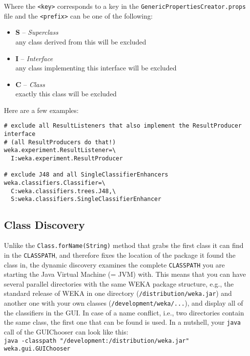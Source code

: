 \noindent Where the \verb=<key>= corresponds to a key in the
\verb=GenericPropertiesCreator.props= file and the \verb=<prefix>= can
be one of the following:

\begin{itemize}
\item \textbf{S} -- \textit{Superclass}\\
  any class derived from this will be excluded
\item \textbf{I} -- \textit{Interface}\\
  any class implementing this interface will be excluded
\item \textbf{C} -- \textit{Class}\\
  exactly this class will be excluded
\end{itemize}

\noindent Here are a few examples:

\begin{verbatim}
# exclude all ResultListeners that also implement the ResultProducer interface
# (all ResultProducers do that!)
weka.experiment.ResultListener=\
  I:weka.experiment.ResultProducer

# exclude J48 and all SingleClassifierEnhancers
weka.classifiers.Classifier=\
  C:weka.classifiers.trees.J48,\
  S:weka.classifiers.SingleClassifierEnhancer
\end{verbatim}

\newpage
\subsection{Class Discovery}
Unlike the \verb=Class.forName(String)= method that grabs the first class it
can find in the \verb=CLASSPATH=, and therefore fixes the location of the
package it found the class in, the dynamic discovery examines the
complete \verb=CLASSPATH= you are starting the Java Virtual Machine (= JVM)
with. This means that you can have several parallel directories with
the same WEKA package structure, e.g., the standard release of WEKA in
one directory (\verb=/distribution/weka.jar=) and another one with your own
classes (\verb=/development/weka/...=), and display all of the classifiers in
the GUI. In case of a name conflict, i.e., two directories contain the
same class, the first one that can be found is used. In a nutshell,
your \texttt{java} call of the GUIChooser can look like this:\\

\verb=java -classpath "/development:/distribution/weka.jar" weka.gui.GUIChooser=\\

